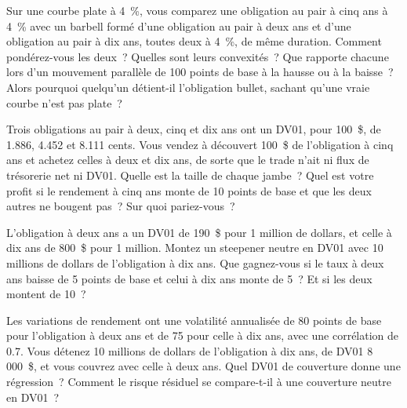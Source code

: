 \begin{question}\label{iq:iv2:rates-and-fx:16}
Sur une courbe plate à 4~\%, vous comparez une obligation au pair à cinq ans à 4~\% avec un barbell formé d'une obligation au pair à deux ans et d'une obligation au pair à dix ans, toutes deux à 4~\%, de même duration. Comment pondérez-vous les deux~? Quelles sont leurs convexités~? Que rapporte chacune lors d'un mouvement parallèle de 100 points de base à la hausse ou à la baisse~? Alors pourquoi quelqu'un détient-il l'obligation bullet, sachant qu'une vraie courbe n'est pas plate~?
\end{question}

\begin{question}\label{iq:iv2:rates-and-fx:17}
Trois obligations au pair à deux, cinq et dix ans ont un DV01, pour 100~\$, de 1.886, 4.452 et 8.111 cents. Vous vendez à découvert 100~\$ de l'obligation à cinq ans et achetez celles à deux et dix ans, de sorte que le trade n'ait ni flux de trésorerie net ni DV01. Quelle est la taille de chaque jambe~? Quel est votre profit si le rendement à cinq ans monte de 10 points de base et que les deux autres ne bougent pas~? Sur quoi pariez-vous~?
\end{question}

\begin{question}\label{iq:iv2:rates-and-fx:18}
L'obligation à deux ans a un DV01 de 190~\$ pour 1 million de dollars, et celle à dix ans de 800~\$ pour 1 million. Montez un steepener neutre en DV01 avec 10 millions de dollars de l'obligation à dix ans. Que gagnez-vous si le taux à deux ans baisse de 5 points de base et celui à dix ans monte de 5~? Et si les deux montent de 10~?
\end{question}

\begin{question}\label{iq:iv2:rates-and-fx:19}
Les variations de rendement ont une volatilité annualisée de 80 points de base pour l'obligation à deux ans et de 75 pour celle à dix ans, avec une corrélation de 0.7. Vous détenez 10 millions de dollars de l'obligation à dix ans, de DV01 8\,000~\$, et vous couvrez avec celle à deux ans. Quel DV01 de couverture donne une régression~? Comment le risque résiduel se compare-t-il à une couverture neutre en DV01~?
\end{question}

